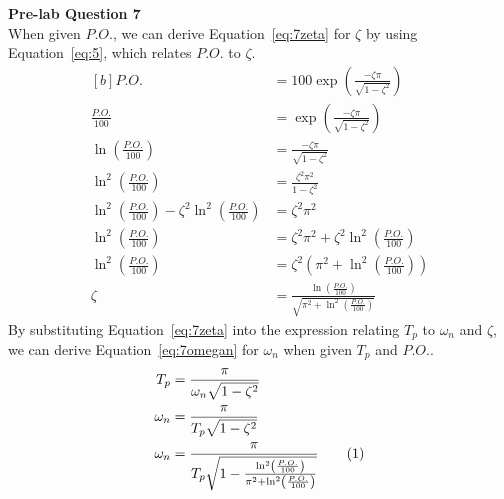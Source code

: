 \documentclass[12pt]{article}
\begin{document}
\textbf{Pre-lab Question 7} \\
When given $P.O.$, we can derive Equation~\ref{eq:7zeta} for $\zeta$ by using Equation~\ref{eq:5}, which relates $P.O.$ to $\zeta$.
\begin{equation} \label{eq:7zeta}
\begin{aligned}[b]
    P.O. &= 100\exp\left(\frac{-\zeta\pi}{\sqrt{1-\zeta^2}}\right) \\
    \frac{P.O.}{100} &= \exp\left(\frac{-\zeta\pi}{\sqrt{1-\zeta^2}}\right) \\
    \ln \left( \frac{P.O.}{100} \right) &= \frac{-\zeta\pi}{\sqrt{1-\zeta^2}} \\
    \ln^2 \left( \frac{P.O.}{100} \right) &= \frac{\zeta^2\pi^2}{1-\zeta^2} \\
    \ln^2 \left( \frac{P.O.}{100} \right) - \zeta^2 \ln^2 \left( \frac{P.O.}{100} \right) &= \zeta^2\pi^2 \\
    \ln^2 \left( \frac{P.O.}{100} \right) &= \zeta^2\pi^2 + \zeta^2 \ln^2 \left( \frac{P.O.}{100} \right) \\
    \ln^2 \left( \frac{P.O.}{100} \right) &= \zeta^2 \left( \pi^2 + \ln^2 \left( \frac{P.O.}{100} \right) \right) \\
    \zeta &= \frac{\ln \left( \frac{P.O.}{100} \right)}{\sqrt{\pi^2 + \ln^2 \left( \frac{P.O.}{100} \right)}}
\end{aligned}
\end{equation}
By substituting Equation~\ref{eq:7zeta} into the expression relating $T_p$ to $\omega_n$ and $\zeta$, we can derive Equation~\ref{eq:7omegan} for $\omega_n$ when given $T_p$ and $P.O.$.
\begin{align*}
    T_p &= \frac{\pi}{\omega_n\sqrt{1-\zeta^2}} \\
    \omega_n &= \frac{\pi}{T_p\sqrt{1-\zeta^2}} \\
    \omega_n &= \frac{\pi}{T_p\sqrt{1 - \frac{\ln^2 \left( \frac{P.O.}{100} \right)}{\pi^2 + \ln^2 \left( \frac{P.O.}{100} \right)}}} \stepcounter{equation}\tag{\theequation}\label{eq:7omegan}
\end{align*} %
\end{document}
